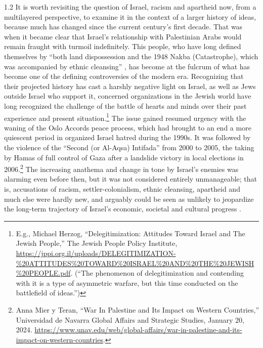 \documentclass[../unravbook.tex]{subfiles}
\begin{document}
\begin{spacing}{1.2}
It is worth revisiting the question of Israel, racism and apartheid now, from a multilayered perspective, to examine it in the context of a larger history of ideas, because much has changed since the current century's first decade. That was when it became clear that Israel's relationship with  Palestinian Arabs would remain fraught with turmoil indefinitely. This people, who have long defined themselves by \enquote{both land dispossession and the 1948 Nakba (Catastrophe), which was accompanied by ethnic cleansing} \parencite[xiii]{Zureik-2016}, has become at the fulcrum of what has become one of the defining controversies of the modern era. Recognizing that their projected history has cast a harshly negative light on Israel, as well as Jews outside Israel who support it, concerned organizations in the Jewish world have long recognized the challenge of the battle of hearts and minds over their past experience and present situation.\footnote{E.g., Michael Herzog, ``Delegitimization: Attitudes Toward Israel and The Jewish People,'' The Jewish People Policy Institute, \url{https://jppi.org.il/uploads/DELEGITIMIZATION-\%20ATTITUDES\%20TOWARD\%20ISRAEL\%20AND\%20THE\%20JEWISH\%20PEOPLE.pdf}. (``The phenomenon of delegitimization and contending with it is a type of asymmetric warfare, but this time conducted on the battlefield of ideas.'')} The issue gained resumed urgency with the waning of the Oslo Accords peace process, which had brought to an end a more quiescent period in organized Israel hatred during the 1990s. It was followed by the violence of the ``Second (or Al-Aqsa) Intifada'' from 2000 to 2005, the taking by Hamas of full control of Gaza after a landslide victory in local elections in 2006.\footnote{Anna Mier y Teran, \enquote{War In Palestine and Its Impact on Western Countries,} Universidad de Navarra Global Affairs and Strategic Studies, January 20, 2024. \url{https://www.unav.edu/web/global-affairs/war-in-palestine-and-its-impact-on-western-countries}.} The increasing anathema and change in tone by Israel's enemies was alarming even before then, but it was not considered entirely unmanageable; that is, accusations of racism, settler-colonialism, ethnic cleansing, apartheid and much else were hardly new, and arguably could be seen as unlikely to jeopardize the long-term trajectory of Israel's economic, societal and cultural progress \parencite[15--26]{Adelman-2008}.  


\end{spacing}
\end{document}
